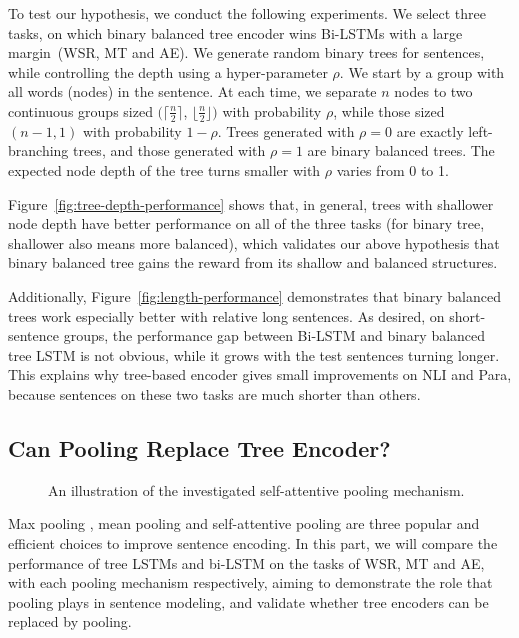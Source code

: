 \documentclass[11pt,a4paper]{article}
\begin{document}
To test our hypothesis, we conduct the following experiments. 
We select three tasks, on which binary balanced tree encoder wins Bi-LSTMs with a large margin~(WSR, MT and AE).
We generate random binary trees for sentences, while controlling the depth using a hyper-parameter $\rho$. 
We start by a group with all words (nodes) in the sentence.
At each time, we separate $n$ nodes to two continuous groups sized $(\lceil \frac{n}{2} \rceil$, $\lfloor \frac{n}{2} \rfloor)$ with probability $\rho$, while those sized $(n-1, 1)$ with probability $1-\rho$.
Trees generated with $\rho=0$ are exactly left-branching trees, and those generated with $\rho=1$ are binary balanced trees. 
The expected node depth of the tree turns smaller with $\rho$ varies from 0 to 1.

Figure~\ref{fig:tree-depth-performance} shows that, in general, trees with shallower node depth have better performance on all of the three tasks (for binary tree, shallower also means more balanced), which validates our above hypothesis that binary balanced tree gains the reward from its shallow and balanced structures. 

Additionally, Figure~\ref{fig:length-performance} demonstrates that binary balanced trees work especially better with relative long sentences. 
As desired, on short-sentence groups, the performance gap between Bi-LSTM and binary balanced tree LSTM is not obvious, while it grows with the test sentences turning longer. 
This explains why tree-based encoder gives small improvements on NLI and Para, because sentences on these two tasks are much shorter than others.




\subsection{Can Pooling Replace Tree Encoder?}
\label{sec:pooling}
\begin{figure}[t]
\centering
{}

\caption{\label{fig:attention} An illustration of the investigated self-attentive pooling mechanism. \\[-0.8cm]}
\end{figure}

Max pooling \cite{collobert2008unified,zhao2015self}, mean pooling \cite{conneau2017supervised} and self-attentive pooling \cite[also known as self-attention;][]{santos2016attentive,liu2016learning,lin2017astructured} are three popular and efficient choices to improve sentence encoding.
In this part, we will compare the performance of tree LSTMs and bi-LSTM on the tasks of WSR, MT and AE, with each pooling mechanism respectively, aiming to demonstrate the role that pooling plays in sentence modeling, and validate whether tree encoders can be replaced by pooling. 
\end{document}
